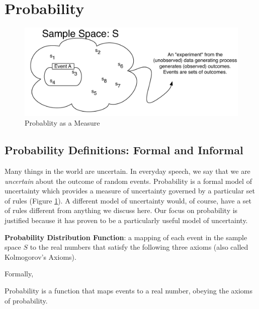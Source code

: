 \documentclass[]{book}
\theoremstyle{definition}
\theoremstyle{definition}
\theoremstyle{definition}
\theoremstyle{remark}
\let\BeginKnitrBlock\begin \let\EndKnitrBlock\end
\begin{document}
\hypertarget{probdef}{%
\section{Probability}\label{probdef}}

\begin{figure}
\centering
\includegraphics{images/probability.pdf}
\caption[\label{fig:prob-image}Probablity as a Measure]{\label{fig:prob-image}Probablity as a Measure\footnotemark{}}
\end{figure}

\hypertarget{probability-definitions-formal-and-informal}{%
\subsection*{Probability Definitions: Formal and Informal}\label{probability-definitions-formal-and-informal}}

Many things in the world are uncertain. In everyday speech, we say that we are \emph{uncertain} about the outcome of random events. Probability is a formal model of uncertainty which provides a measure of uncertainty governed by a particular set of rules (Figure \ref{fig:prob-image}). A different model of uncertainty would, of course, have a set of rules different from anything we discuss here. Our focus on probability is justified because it has proven to be a particularly useful model of uncertainty.

\textbf{Probability Distribution Function}: a mapping of each event in the sample space \(S\) to the real numbers that satisfy the following three axioms (also called Kolmogorov's Axioms).

Formally,

\BeginKnitrBlock{definition}[Probability]
\protect\hypertarget{def:unnamed-chunk-66}{}{\label{def:unnamed-chunk-66} {} }
Probability is a function that maps events to a real number, obeying the axioms of probability.
\EndKnitrBlock{definition}
\end{document}

